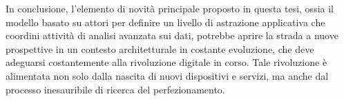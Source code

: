 In conclusione, l'elemento di novità principale proposto in questa tesi, ossia il modello basato su attori per definire un livello di astrazione applicativa che coordini attività di analisi avanzata sui dati, potrebbe aprire la strada a nuove prospettive in un contesto architetturale in costante evoluzione, che deve adeguarsi costantemente alla rivoluzione digitale in corso.
Tale rivoluzione è alimentata non solo dalla nascita di nuovi dispositivi e servizi, ma anche dal processo inesauribile di ricerca del perfezionamento.